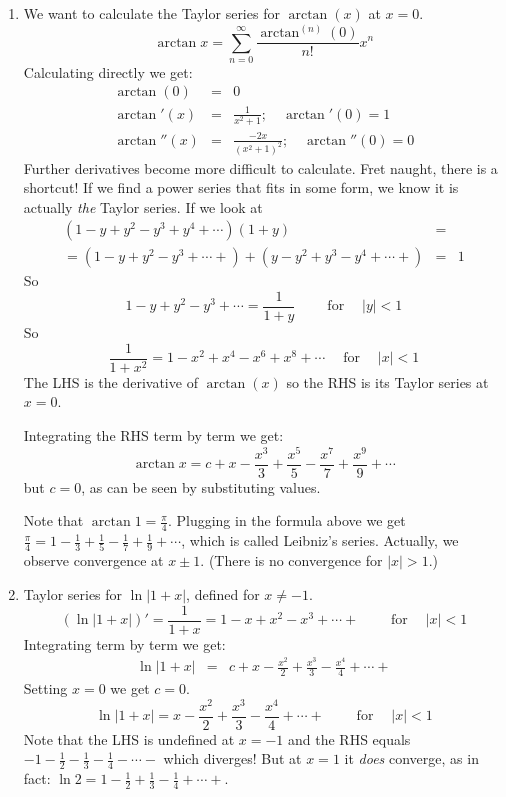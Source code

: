\documentclass{article}
\newcommand{\mathpi}{\pi}
\newcommand{\tmem}[1]{{\em #1\/}}
\newcommand{\tmop}[1]{\ensuremath{\operatorname{#1}}}
\newcommand{\tmxspace}{\hspace{1em}}
\begin{document}
\begin{enumerate}
  \item We want to calculate the Taylor series for $\arctan (x)$ at $x = 0$.
  \[ \arctan x = \sum_{n = 0}^{\infty} \frac{\arctan^{(n)} (0)}{n!} x^n \]
  Calculating directly we get:
  \begin{eqnarray*}
    \arctan (0) & = & 0\\
    \arctan' (x) & = & \frac{1}{x^2 + 1} ; \quad \arctan' (0) = 1\\
    \arctan'' (x) & = & \frac{- 2 x}{(x^2 + 1)^2} ; \quad \arctan'' (0) = 0
  \end{eqnarray*}
  Further derivatives become more difficult to calculate. Fret naught, there
  is a shortcut! If we find a power series that fits in some form, we know it
  is actually {\tmem{the}} Taylor series. If we look at
  \begin{eqnarray*}
    (1 - y + y^2 - y^3 + y^4 + \cdots) (1 + y) & = & \\
    = (1 - y + y^2 - y^3 + \cdots +) + (y - y^2 + y^3 - y^4 + \cdots +) & = &
    1
  \end{eqnarray*}
  So
  \[ 1 - y + y^2 - y^3 + \cdots = \frac{1}{1 + y} \tmxspace \quad \tmop{for}
     \quad | y | < 1 \]
  So
  \[ \frac{1}{1 + x^2} = 1 - x^2 + x^4 - x^6 + x^8 + \cdots \quad \tmop{for}
     \quad | x | < 1 \]
  The LHS is the derivative of $\arctan (x)$ so the RHS is its Taylor series
  at $x = 0$.
  
  Integrating the RHS term by term we get:
  \[ \arctan x = c + x - \frac{x^3}{3} + \frac{x^5}{5} - \frac{x^7}{7} +
     \frac{x^9}{9} + \cdots \]
  but $c = 0$, as can be seen by substituting values.
  
  Note that $\arctan 1 = \frac{\mathpi}{4}$. Plugging in the formula above we
  get ${\frac{\mathpi}{4} = 1 - \frac{1}{3} + \frac{1}{5} - \frac{1}{7} +
  \frac{1}{9} + \cdots}$, which is called Leibniz's series. Actually, we
  observe convergence at $x \pm 1$. (There is no convergence for $| x | > 1$.)
  
  \item Taylor series for $\ln | 1 + x |$, defined for $x \neq - 1$.
  \[ (\ln | 1 + x |)' = \frac{1}{1 + x} = 1 - x + x^2 - x^3 + \cdots +
     \tmxspace \quad \tmop{for} \quad | x | < 1 \]
  Integrating term by term we get:
  \begin{eqnarray*}
    \ln | 1 + x | & = & c + x - \frac{x^2}{2} + \frac{x^3}{3} - \frac{x^4}{4}
    + \cdots +
  \end{eqnarray*}
  Setting $x = 0$ we get $c = 0$.
  \[ \ln | 1 + x | = x - \frac{x^2}{2} + \frac{x^3}{3} - \frac{x^4}{4} +
     \cdots + \tmxspace \quad \tmop{for} \quad | x | < 1 \]
  Note that the LHS is undefined at $x = - 1$ and the RHS equals ${- 1 -
  \frac{1}{2} - \frac{1}{3} - \frac{1}{4} - \cdots -}$ which diverges! But at
  $x = 1$ it {\tmem{does}} converge, as in fact: {{$\ln 2 = 1 - \frac{1}{2} +
  \frac{1}{3} - \frac{1}{4} + \cdots +$}.}
\end{enumerate}
\end{document}
